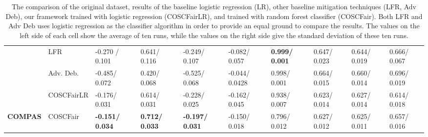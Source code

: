 \begin{table*}[h!]
{\begin{minipage}{\textwidth}
\begin{tabular}{|c|l|l|l|l|l|l|l|l|l|}
                                        & LFR                                & -0.270 / 0.101         & 0.641/ 0.116          & -0.249/ 0.107          & -0.082/ 0.057          & \textbf{0.999/ 0.001} & 0.647/ 0.023          & 0.644/ 0.019          & 0.666/ 0.067          \\ \cline{2-10} 
                                        & Adv. Deb.                          & -0.485/ 0.072          & 0.420/ 0.068          & -0.525/ 0.068          & -0.044/ 0.0428         & 0.998/ 0.001          & 0.664/ 0.015          & 0.660/ 0.014          & 0.696/ 0.019          \\ \cline{2-10} 
                                        & \cellcolor[HTML]{D9D9D9}COSCFairLR & -0.176/ 0.031          & 0.614/ 0.031          & -0.228/ 0.025          & -0.162/ 0.045          & 0.938/ 0.007          & 0.623/ 0.014          & 0.627/ 0.014          & 0.614/ 0.018          \\ \cline{2-10} 
\multirow{-6}{*}{\textbf{COMPAS}}       & \cellcolor[HTML]{D9D9D9}COSCFair   & \textbf{-0.151/ 0.034} & \textbf{0.712/ 0.033} & \textbf{-0.197/ 0.031} & -0.150/ 0.018          & 0.796/ 0.012          & 0.627/ 0.012          & 0.625/ 0.011          & 0.657/ 0.016          \\ \hline
\end{tabular}
\end{minipage}}
\caption{\label{Table3} The comparison of the original dataset, results of the baseline logistic regression (LR), other baseline mitigation techniques (LFR, Adv Deb), our framework trained with logistic regression (COSCFairLR), and trained with random forest classifier (COSCFair). Both LFR and Adv Deb uses logistic regression as the classifier algorithm in order to provide an equal ground to compare the results. The values on the left side of each cell show the average of ten runs, while the values on the right side give the standard deviation of these ten runs.}
\vskip -0.2in
\end{table*}

